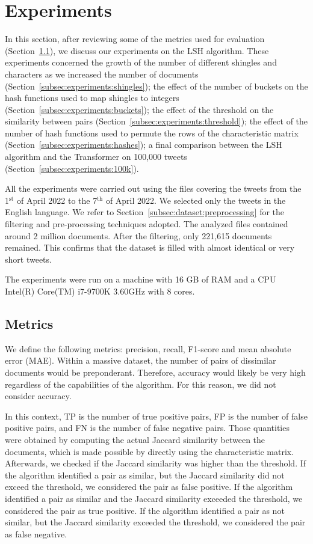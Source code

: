 \documentclass[runningheads]{llncs}
\begin{document}
\section{Experiments}
\label{sec:experiments}

In this section, after reviewing some of the metrics used for evaluation (Section~\ref{subsec:experiments:metrics}), we discuss our experiments on the LSH algorithm. These experiments concerned the growth of the number of different shingles and characters as we increased the number of documents (Section~\ref{subsec:experiments:shingles}); the effect of the number of buckets on the hash functions used to map shingles to integers (Section~\ref{subsec:experiments:buckets}); the effect of the threshold on the similarity between pairs (Section~\ref{subsec:experiments:threshold}); the effect of the number of hash functions used to permute the rows of the characteristic matrix (Section~\ref{subsec:experiments:hashes}); a final comparison between the LSH algorithm and the Transformer on 100,000 tweets (Section~\ref{subsec:experiments:100k}).

All the experiments were carried out using the files covering the tweets from the 1$^{\text{st}}$ of April 2022 to the 7$^{\text{th}}$ of April 2022. We selected only the tweets in the English language. We refer to Section~\ref{subsec:dataset:preprocessing} for the filtering and pre-processing techniques adopted. The analyzed files contained around 2 million documents. After the filtering, only 221,615 documents remained. This confirms that the dataset is filled with almost identical or very short tweets. 

The experiments were run on a machine with 16 GB of
RAM and a CPU Intel(R) Core(TM) i7-9700K 3.60GHz with 8 cores.

\subsection{Metrics}
\label{subsec:experiments:metrics}

We define the following metrics: precision, recall, F1-score and mean absolute error (MAE). Within a massive dataset, the number of pairs of dissimilar documents would be preponderant. Therefore, accuracy would likely be very high regardless of the capabilities of the algorithm.
For this reason, we did not consider accuracy. 

In this context, TP is the number of true positive pairs, FP is the number of false positive pairs, and FN is the number of false negative pairs. Those quantities were obtained by computing the actual Jaccard similarity between the documents, which is made possible by directly using the characteristic matrix. Afterwards, we checked if the Jaccard similarity was higher than the threshold.
If the algorithm identified a pair as similar, but the Jaccard similarity did not exceed the threshold, we considered the pair as false positive. If the algorithm identified a pair as similar and the Jaccard similarity exceeded the threshold, we considered the pair as true positive. If the algorithm identified a pair as not similar, but the Jaccard similarity exceeded the threshold, we considered the pair as false negative.
\end{document}
